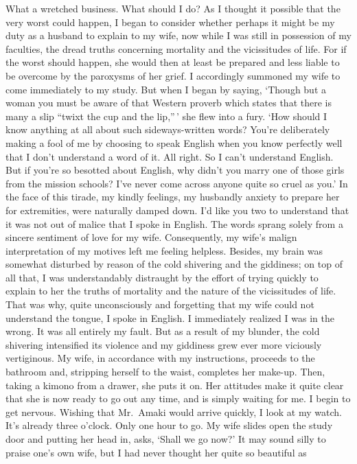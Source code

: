 \documentclass{book}
\begin{document}
What a wretched business. What should I do? As I thought it possible
that the very worst could happen, I began to consider whether perhaps it
might be my duty as a husband to explain to my wife, now while I was
still in possession of my faculties, the dread truths concerning
mortality and the vicissitudes of life. For if the worst should happen,
she would then at least be prepared and less liable to be overcome by
the paroxysms of her grief. I accordingly summoned my wife to come
immediately to my study. But when I began by saying, `Though but a woman
you must be aware of that Western proverb which states that there is
many a slip ``twixt the cup and the lip,''\,' she flew into a fury. `How
should I know anything at all about such sideways-written words? You're
deliberately making a fool of me by choosing to speak English when you
know perfectly well that I don't understand a word of it. All right. So
I can't understand English. But if you're so besotted about English, why
didn't you marry one of those girls from the mission schools? I've never
come across anyone quite so cruel as you.' In the face of this tirade,
my kindly feelings, my husbandly anxiety to prepare her for extremities,
were naturally damped down. I'd like you two to understand that it was
not out of malice that I spoke in English. The words sprang solely from
a sincere sentiment of love for my wife. Consequently, my wife's malign
interpretation of my motives left me feeling helpless. Besides, my brain
was somewhat disturbed by reason of the cold shivering and the
giddiness; on top of all that, I was understandably distraught by the
effort of trying quickly to explain to her the truths of mortality and
the nature of the vicissitudes of life. That was why, quite
unconsciously and forgetting that my wife could not understand the
tongue, I spoke in English. I immediately realized I was in the wrong.
It was all entirely my fault. But as a result of my blunder, the cold
shivering intensified its violence and my giddiness grew ever more
viciously vertiginous. My wife, in accordance with my instructions,
proceeds to the bathroom and, stripping herself to the waist, completes
her make-up. Then, taking a kimono from a drawer, she puts it on. Her
attitudes make it quite clear that she is now ready to go out any time,
and is simply waiting for me. I begin to get nervous. Wishing that
Mr.~Amaki would arrive quickly, I look at my watch. It's already three
o'clock. Only one hour to go. My wife slides open the study door and
putting her head in, asks, `Shall we go now?' It may sound silly to
praise one's own wife, but I had never thought her quite so beautiful as
\end{document}
